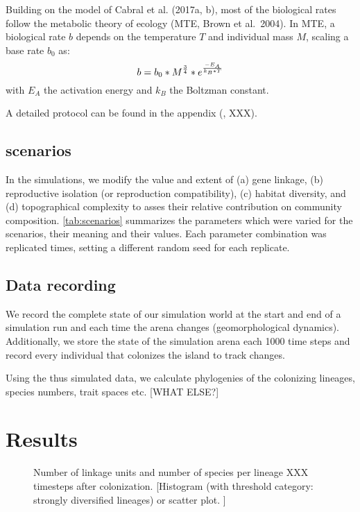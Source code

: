 \documentclass[a4paper]{scrartcl}
\begin{document}
Building on the model of Cabral et al. (2017a, b), most of the biological rates follow the metabolic theory
of ecology (MTE, Brown et al.\ 2004). %
In MTE, a biological rate $b$ depends on the temperature $T$ and individual mass $M$, scaling a base rate $b_0$ as:
\begin{equation}
  b=b_0*M^{3\over4}*e^{-{E_A}\over{k_B*T}}
  \label{eq:MTE}
\end{equation}
with $E_A$ the activation energy and $k_B$ the Boltzman constant.

A detailed protocol can be found in the appendix (\cite{grimm2010odd}, XXX).

\subsection{scenarios}
In the simulations, we modify the value and extent of
(a) gene linkage,
(b) reproductive isolation (or reproduction compatibility),
(c) habitat diversity, and
(d) topographical complexity
to asses their relative contribution on community composition.
\cref{tab:scenarios} summarizes the parameters which were varied for the scenarios, their meaning and their values. %
Each parameter combination was replicated %
times, setting a different random seed for each replicate.

\subsection{Data recording}
We record the complete state of our simulation world at the start and end of a simulation run and each time the arena changes (geomorphological dynamics).
Additionally, we store the state of the simulation arena each 1000 %
time steps and record every individual that colonizes the island to track changes.

Using the thus simulated data, we calculate phylogenies of the colonizing lineages, species numbers, trait spaces etc. [WHAT ELSE?]

\section{Results}

\begin{figure}
  \caption{Number of linkage units and number of species per lineage XXX timesteps after colonization.
    [Histogram (with threshold category: strongly diversified lineages) or scatter plot. ]}%
  \label{specieslinkage}
\end{figure}
\end{document}
